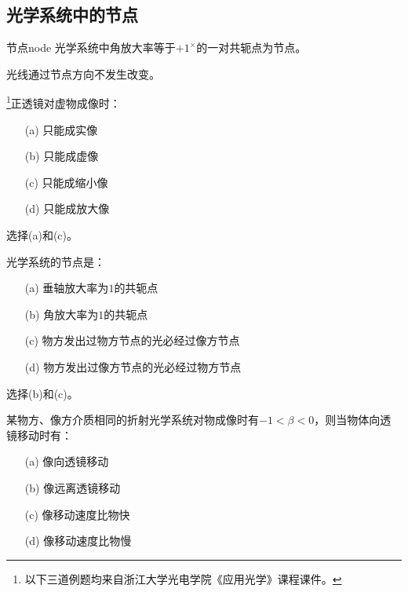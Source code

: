 \documentclass[cn,11pt]{elegantbook}
\begin{document}
\subsection{光学系统中的节点}
\label{subsect:node}
\begin{definition}{节点}{node}
	光学系统中角放大率等于$+1^{\times}$的一对共轭点为节点。
\end{definition}

\begin{property}
	光线通过节点方向不发生改变。
\end{property}

\begin{problem}
	\footnote{以下三道例题均来自浙江大学光电学院《应用光学》课程课件。}正透镜对虚物成像时：
	\begin{itemize}
		\item [(a)] 只能成实像
		\item [(b)] 只能成虚像
		\item [(c)] 只能成缩小像
		\item [(d)] 只能成放大像
	\end{itemize}
\end{problem}

\begin{solution}
	选择(a)和(c)。
\end{solution}

\begin{problem}
	光学系统的节点是：
	\begin{itemize}
		\item [(a)] 垂轴放大率为$1$的共轭点
		\item [(b)] 角放大率为$1$的共轭点
		\item [(c)] 物方发出过物方节点的光必经过像方节点
		\item [(d)] 物方发出过像方节点的光必经过物方节点
	\end{itemize}
\end{problem}

\begin{solution}
	选择(b)和(c)。
\end{solution}

\begin{problem}
	某物方、像方介质相同的折射光学系统对物成像时有$-1<\beta<0$，则当物体向透镜移动时有：
	\begin{itemize}
		\item [(a)] 像向透镜移动
		\item [(b)] 像远离透镜移动
		\item [(c)] 像移动速度比物快
		\item [(d)] 像移动速度比物慢
	\end{itemize}
\end{problem}
\end{document}
